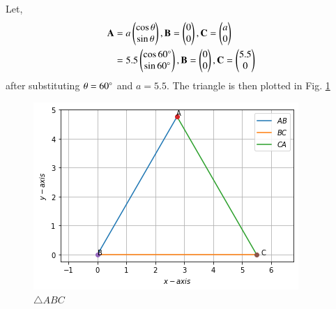 
Let,
\begin{align}
\mathbf{A}&=a\begin{pmatrix}\cos\theta\\ \sin\theta\end{pmatrix},\mathbf{B}=\begin{pmatrix}0\\0\end{pmatrix},\mathbf{C}=\begin{pmatrix}a\\0\end{pmatrix} \\
    &= 5.5\begin{pmatrix}\cos60\degree\\\sin60\degree\end{pmatrix},\mathbf{B}=\begin{pmatrix}0\\0\end{pmatrix},\mathbf{C}=\begin{pmatrix}5.5\\0\end{pmatrix}
    \end{align}
after substituting     $\theta=60\degree$
and $a=5.5$.  The triangle is then plotted in Fig. \ref{constr/tri/11/fig:triangle ABC}
%
\begin{figure}[ht]
\centering
\includegraphics[width=\columnwidth]{solutions/triangle/11/Figure 1.png}
\caption{$\triangle ABC$}
\label{constr/tri/11/fig:triangle ABC}
\end{figure}
